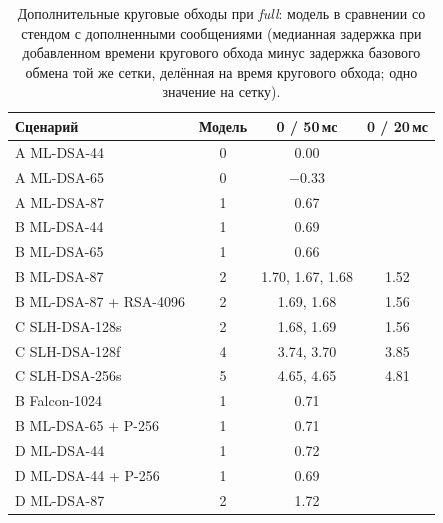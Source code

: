 \documentclass[conference,a4paper]{IEEEtran}
\newcommand{\newgreen}[1]{{\color{green!50!black}#1}}
\newcommand{\newviolet}[1]{{\color{violet}#1}}
\begin{document}
{\begin{table}[!htb]
\centering\footnotesize
\setlength{\tabcolsep}{3.5pt}
\caption{Дополнительные круговые обходы при \emph{full}: модель в сравнении со стендом с дополненными сообщениями
(\newgreen{медианная задержка при добавленном времени кругового обхода минус задержка базового обмена той же сетки,
делённая на время кругового обхода}; одно значение на сетку).}
\label{tab:pqcheck}
\color{blue}
\begin{tabular}{@{}lccc@{}}
\toprule
Сценарий & Модель & 0 / 50\,мс & 0 / 20\,мс \\
\midrule
A ML-DSA-44 & 0 & 0.00 & \\
A ML-DSA-65 & 0 & $-0.33$ & \\
A ML-DSA-87 & 1 & 0.67 & \\
B ML-DSA-44 & 1 & 0.69 & \\
B ML-DSA-65 & 1 & 0.66 & \\
B ML-DSA-87 & 2 & 1.70, 1.67, 1.68 & 1.52 \\
B ML-DSA-87 + RSA-4096 & 2 & 1.69, 1.68 & 1.56 \\
C SLH-DSA-128s & 2 & 1.68, 1.69 & 1.56 \\
C SLH-DSA-128f & 4 & 3.74, \newviolet{3.70} & 3.85 \\
C SLH-DSA-256s & 5 & 4.65, 4.65 & 4.81 \\
\newviolet{B Falcon-1024} & \newviolet{1} & \newviolet{0.71} & \\
\newviolet{B ML-DSA-65 + P-256} & \newviolet{1} & \newviolet{0.71} & \\
\newviolet{D ML-DSA-44} & \newviolet{1} & \newviolet{0.72} & \\
\newviolet{D ML-DSA-44 + P-256} & \newviolet{1} & \newviolet{0.69} & \\
\newviolet{D ML-DSA-87} & \newviolet{2} & \newviolet{1.72} & \\
\bottomrule
\end{tabular}
\end{table}

}
\end{document}
